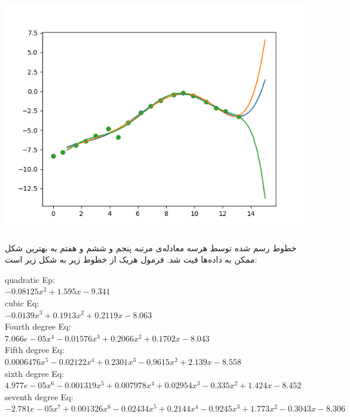 \documentclass{article}
\begin{document}
\begin{latin}
\begin{center}
\includegraphics[scale=0.75]{fifth degree, sixth degree, seventh degree, curve fit.png}
\end{center}
\end{latin}

خطوط رسم شده توسط هر‌سه معادله‌ی مرتبه‌ پنجم و ششم و هفتم به بهترین شکل ممکن به داده‌ها فیت شد. فرمول هریک از خطوط زیر به شکل زیر است:

\begin{latin}

quadratic Ep:\\      
$-0.08125 x^2 + 1.595 x - 9.341$\\
cubic Eq:\\   
$-0.0139 x^3 + 0.1913 x^2 + 0.2119 x - 8.063$\\
Fourth degree Eq:\\
$7.066e-05 x^4 - 0.01576 x^3 + 0.2066 x^2 + 0.1702 x - 8.043$\\
Fifth degree Eq:\\
$0.0006476 x^5 - 0.02122 x^4 + 0.2301 x^3 - 0.9615 x^2 + 2.139 x - 8.558$\\
sixth degree Eq:\\
$4.977e-05 x^6 - 0.001319 x^5 + 0.007978 x^4 + 0.02954 x^3 - 0.335 x^2 + 1.424 x - 8.452$\\
seventh degree Eq:\\
$-2.781e-05 x^7 + 0.001326 x^6 - 0.02434 x^5 + 0.2144 x^4 - 0.9245 x^3 + 1.773 x^2 - 0.3043 x - 8.306$\\
\end{latin}
\end{document}
